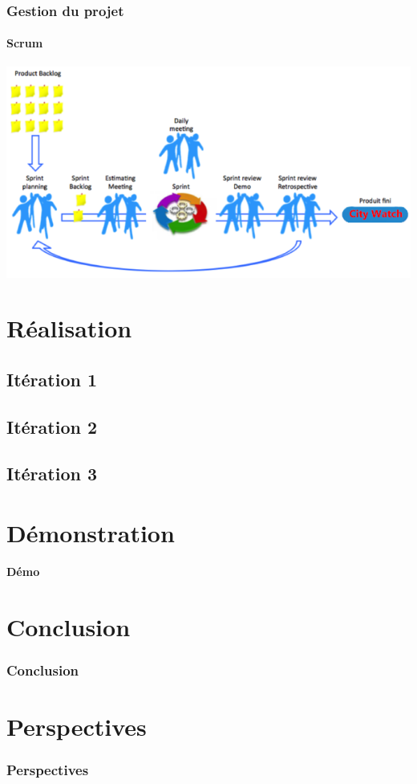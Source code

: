 \documentclass{beamer}
\begin{document}
\begin{frame}
    \frametitle{Gestion du projet}
    \framesubtitle{Scrum}
    \includegraphics{../figures/scrum-model.png}
\end{frame}

\section{Réalisation}
\subsection{Itération 1}
\subsection{Itération 2}
\subsection{Itération 3}
\begin{frame}
    \frametitle{}
\end{frame}

\begin{frame}
    \frametitle{}
\end{frame}

\section{Démonstration}
\begin{frame}
    \begin{center}
        \textbf{\Huge Démo}
    \end{center}
\end{frame}

\section{Conclusion}
\begin{frame}
    \frametitle{Conclusion}
\end{frame}

\section{Perspectives}
\begin{frame}
    \frametitle{Perspectives}
\end{frame}
\end{document}
